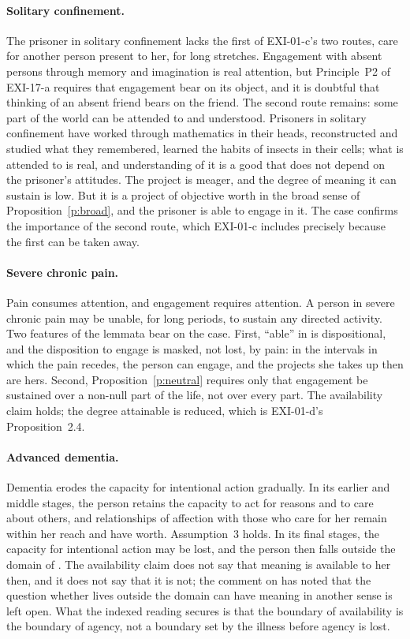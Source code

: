 \paragraph{Solitary confinement.} The prisoner in solitary confinement lacks the first of EXI-01-c's two routes, care for another person present to her, for long stretches. Engagement with absent persons through memory and imagination is real attention, but Principle~P2 of EXI-17-a requires that engagement bear on its object, and it is doubtful that thinking of an absent friend bears on the friend. The second route remains: some part of the world can be attended to and understood. Prisoners in solitary confinement have worked through mathematics in their heads, reconstructed and studied what they remembered, learned the habits of insects in their cells; what is attended to is real, and understanding of it is a good that does not depend on the prisoner's attitudes. The project is meager, and the degree of meaning it can sustain is low. But it is a project of objective worth in the broad sense of Proposition~\ref{p:broad}, and the prisoner is able to engage in it. The case confirms the importance of the second route, which EXI-01-c includes precisely because the first can be taken away.

\paragraph{Severe chronic pain.} Pain consumes attention, and engagement requires attention. A person in severe chronic pain may be unable, for long periods, to sustain any directed activity. Two features of the lemmata bear on the case. First, \enquote{able} in  is dispositional, and the disposition to engage is masked, not lost, by pain: in the intervals in which the pain recedes, the person can engage, and the projects she takes up then are hers. Second, Proposition~\ref{p:neutral} requires only that engagement be sustained over a non-null part of the life, not over every part. The availability claim holds; the degree attainable is reduced, which is EXI-01-d's Proposition~2.4.

\paragraph{Advanced dementia.} Dementia erodes the capacity for intentional action gradually. In its earlier and middle stages, the person retains the capacity to act for reasons and to care about others, and relationships of affection with those who care for her remain within her reach and have worth. Assumption~3 holds. In its final stages, the capacity for intentional action may be lost, and the person then falls outside the domain of . The availability claim does not say that meaning is available to her then, and it does not say that it is not; the comment on  has noted that the question whether lives outside the domain can have meaning in another sense is left open. What the indexed reading secures is that the boundary of availability is the boundary of agency, not a boundary set by the illness before agency is lost.

